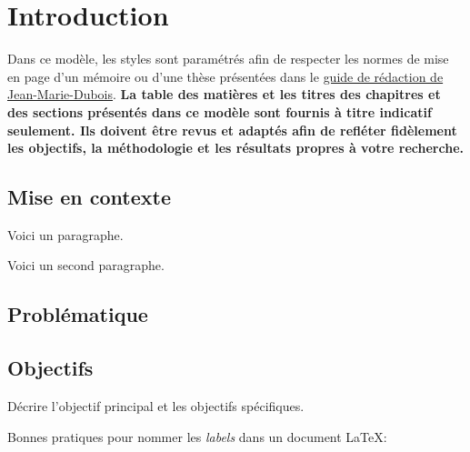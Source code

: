 \chapter{Introduction} \label{chap:introduction}

Dans ce modèle, les styles sont paramétrés afin de respecter les normes de mise en page d’un mémoire ou d'une thèse présentées dans le \href{https://www.usherbrooke.ca/geomatique/fileadmin/sites/geomatique/espace-etudiant/guide-redaction2004_vf.pdf}{guide de rédaction de Jean-Marie-Dubois}. \textcolor{eclipsepurple}{\textbf{La table des matières et les titres des chapitres et des sections présentés dans ce modèle sont fournis à titre indicatif seulement. Ils doivent être revus et adaptés afin de refléter fidèlement les objectifs, la méthodologie et les résultats propres à votre recherche.}}


\section{Mise en contexte} \label{sec:mise_en_contexte}
Voici un paragraphe.

Voici un second paragraphe.

\lipsum[1-4] %

\section{Problématique} \label{sec:problematique}

\lipsum[1-2] %

\section{Objectifs} \label{sec:objectifs}

Décrire l’objectif principal et les objectifs spécifiques.

Bonnes pratiques pour nommer les \textit{labels} dans un document \LaTeX :


